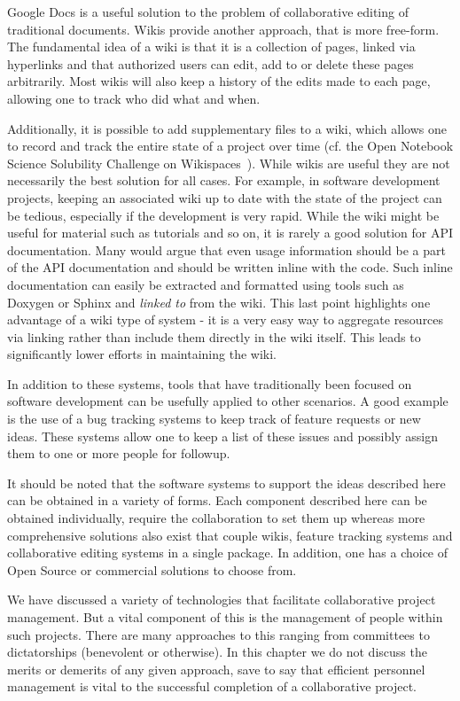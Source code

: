 \documentclass[11pt]{book}
\begin{document}
Google Docs is a useful solution to the problem of collaborative
editing of traditional documents. Wikis provide another approach, that
is more free-form. The fundamental idea of a wiki is that it is a
collection of pages, linked via hyperlinks and that authorized users
can edit, add to or delete these pages arbitrarily. Most wikis will
also keep a history of the edits made to each page, allowing one to
track who did what and when. 

Additionally, it is possible to add supplementary files to a wiki,
which allows one to record and track the entire state of a project
over time (cf. the Open Notebook Science Solubility Challenge on
Wikispaces~\cite{ons:exp34}). While wikis are useful they are not necessarily the
best solution for all cases. For example, in software development
projects, keeping an associated wiki up to date with the state of the
project can be tedious, especially if the development is very
rapid. While the wiki might be useful for material such as tutorials
and so on, it is rarely a good solution for API documentation. Many
would argue that even usage information should be a part of the API
documentation and should be written inline with the code. Such inline
documentation can easily be extracted and formatted using tools such
as Doxygen or Sphinx and \emph{linked to} from the wiki. This last
point highlights one advantage of a wiki type of system - it is a very
easy way to aggregate resources via linking rather than include them
directly in the wiki itself. This leads to significantly lower efforts
in maintaining the wiki.

In addition to these systems, tools that have traditionally been
focused on software development can be usefully applied to other
scenarios. A good example is the use of a bug tracking systems to keep
track of feature requests or new ideas. These systems allow one to
keep a list of these issues and possibly assign them to one or more
people for followup.

It should be noted that the software systems to support the ideas
described here can be obtained in a variety of forms. Each component
described here can be obtained individually, require the collaboration
to set them up whereas more comprehensive solutions also exist that
couple wikis, feature tracking systems and collaborative editing
systems in a single package. In addition, one has a choice of Open
Source or commercial solutions to choose from.

We have discussed a variety of technologies that facilitate
collaborative project management. But a vital component of this is the
management of people within such projects. There are many approaches to
this ranging from committees to dictatorships (benevolent or
otherwise). In this chapter we do not discuss the merits or demerits
of any given approach, save to say that efficient personnel management
is vital to the successful completion of a collaborative project.
\end{document}

